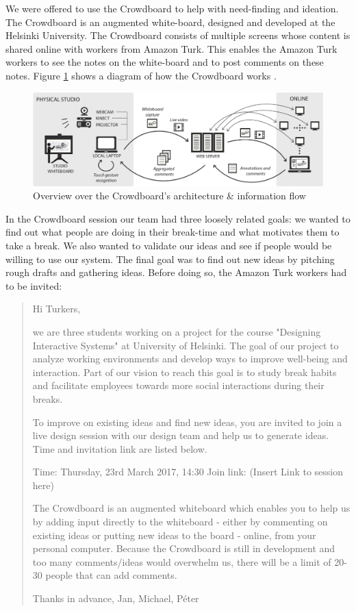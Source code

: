 We were offered to use the Crowdboard to help with  need-finding and ideation. The Crowdboard is an augmented white-board, designed and developed at the Helsinki University. The Crowdboard consists of multiple screens whose content is shared online with workers from Amazon Turk. This enables the Amazon Turk workers to see the notes on the white-board and to post comments on these notes. Figure \ref{fig:crowdboard-diagram} shows a diagram of how the Crowdboard works \cite{crowdboard}. 

\begin{figure}[h]
 \centering
 \includegraphics[width=\textwidth]{images/crowdboard-diagram.png}
 \caption{Overview over the Crowdboard's architecture \& information flow \cite{crowdboard}}
 \label{fig:crowdboard-diagram}
\end{figure}




In the Crowdboard session our team had three loosely related goals: we wanted to find out what people are doing in their break-time and what motivates them to take a break. We also wanted to validate our ideas and see if people would be willing to use our system. The final goal was to find out new ideas by pitching rough drafts and gathering ideas. Before doing so, the Amazon Turk workers had to be invited:


\begin{quote}
Hi Turkers,

we are three students working on a project for the course "Designing Interactive Systems" at University of Helsinki. The goal of our project to analyze working environments and develop ways to improve well-being and interaction. Part of our vision to reach this goal is to study break habits and facilitate employees towards more social interactions during their breaks. 

To improve on existing ideas and find new ideas, you are invited to join a live design session with our design team and help us to generate ideas. Time and invitation link are listed below.

Time: Thursday, 23rd March 2017, 14:30
Join link: (Insert Link to session here)

The Crowdboard is an augmented whiteboard which enables you to help us by adding input directly to the whiteboard - either by commenting on existing ideas or putting new ideas to the board - online, from your personal computer. Because the Crowdboard is still in development and too many comments/ideas would overwhelm us, there will be a limit of 20-30 people that can add comments. 

Thanks in advance,
Jan, Michael, Péter
\end{quote}

